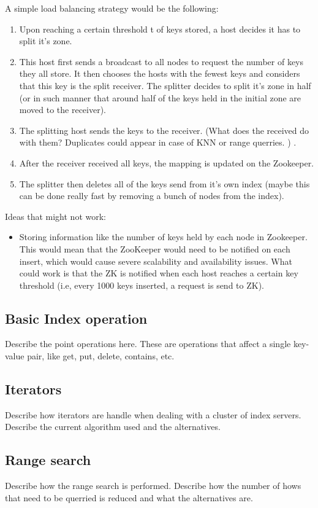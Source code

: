 \documentclass[11pt,a4paper]{globis-book}
\begin{document}
A simple load balancing strategy would be the following:
\begin{enumerate}
    \item Upon reaching a certain threshold t of keys stored, a host decides it has to split it's zone.
    \item This host first sends a broadcast to all nodes to request the number of keys they all store. It then chooses the hosts with the fewest keys and considers that this key is the split receiver. The splitter decides to split it's zone in half (or in such manner that around half of the keys held in the initial zone are moved to the receiver).
    \item The splitting host sends the keys to the receiver. (What does the received do with them? Duplicates could appear in case of KNN or range querries. ) . 
    \item After the receiver received all keys, the mapping is updated on the Zookeeper.
    \item The splitter then deletes all of the keys send from it's own index (maybe this can be done really fast by removing a bunch of nodes from the index).
\end{enumerate}

Ideas that might not work:
\begin{itemize}
    \item Storing information like the number of keys held by each node in Zookeeper. This would mean that the ZooKeeper would need to be notified on each insert, which would cause severe scalability and availability issues. What could work is that the ZK is notified when each host reaches a certain key threshold (i.e, every 1000 keys inserted, a request is send to ZK).
\end{itemize}
\subsection{Basic Index operation}

Describe the point operations here. These are operations that affect a single key-value pair, like get, put, delete, contains, etc.

\subsection{Iterators}
Describe how iterators are handle when dealing with a cluster of index servers. Describe the current algorithm used and the alternatives.

\subsection{Range search}
Describe how the range search is performed. Describe how the number of hows that need to be querried is reduced and what the alternatives are.
\end{document}
